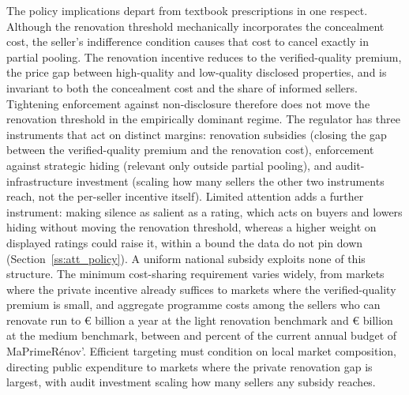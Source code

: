 The policy implications depart from textbook prescriptions in one respect. Although the renovation threshold mechanically incorporates the concealment cost, the seller's indifference condition causes that cost to cancel exactly in partial pooling. The renovation incentive reduces to the verified-quality premium, the price gap between high-quality and low-quality disclosed properties, and is invariant to both the concealment cost and the share of informed sellers. Tightening enforcement against non-disclosure therefore does not move the renovation threshold in the empirically dominant regime. The regulator has three instruments that act on distinct margins: renovation subsidies (closing the gap between the verified-quality premium and the renovation cost), enforcement against strategic hiding (relevant only outside partial pooling), and audit-infrastructure investment (scaling how many sellers the other two instruments reach, not the per-seller incentive itself). Limited attention adds a further instrument: making silence as salient as a rating, which acts on buyers and lowers hiding without moving the renovation threshold, whereas a higher weight on displayed ratings could raise it, within a bound the data do not pin down (Section~\ref{ss:att_policy}). %
 A uniform national subsidy exploits none of this structure. The minimum cost-sharing requirement varies widely, from markets where the private incentive already suffices to markets where the verified-quality premium is small, and aggregate programme costs among the sellers who can renovate run to \euro{}\attScCostBaseTotTwoFifty{} billion a year at the light renovation benchmark and \euro{}\attScCostBaseTotFiveHundred{} billion at the medium benchmark, between \attScCostBaseTotTwoFiftyLo{} and \attScCostBaseTotFiveHundredHi{} percent of the current annual budget of MaPrimeR\'enov'. Efficient targeting must condition on local market composition, directing public expenditure to markets where the private renovation gap is largest, with audit investment scaling how many sellers any subsidy reaches.
